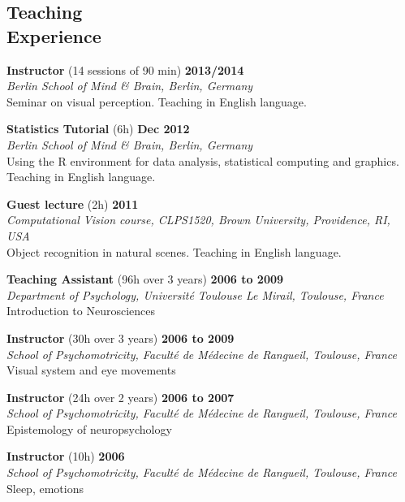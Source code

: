\documentclass[margin,line]{resume}
\begin{document}
\begin{resume}
    \section{\mysidestyle Teaching\\Experience}
    
    \textbf{Instructor} (14 sessions of 90 min) \hfill \textbf{2013/2014}\\
	\textsl{Berlin School of Mind \& Brain, Berlin, Germany}\\
	Seminar on visual perception. Teaching in English language.
	
    \textbf{Statistics Tutorial} (6h) \hfill \textbf{Dec 2012}\\
	\textsl{Berlin School of Mind \& Brain, Berlin, Germany}\\
	Using the R environment for data analysis, statistical computing and graphics. Teaching in English language.

	\textbf{Guest lecture} (2h) \hfill \textbf{2011}\\
	\textsl{Computational Vision course, CLPS1520, Brown University, Providence, RI, USA}\\
	Object recognition in natural scenes. Teaching in English language.

	\textbf{Teaching Assistant} (96h over 3 years) \hfill \textbf{2006 to 2009}\\
	\textsl{Department of Psychology, Université Toulouse Le Mirail, Toulouse, France}\\
	Introduction to Neurosciences

	\textbf{Instructor} (30h over 3 years) \hfill \textbf{2006 to 2009}\\
	\textsl{School of Psychomotricity, Faculté de Médecine de Rangueil, Toulouse, France}\\
	Visual system and eye movements

	\textbf{Instructor} (24h over 2 years) \hfill \textbf{2006 to 2007}\\
	\textsl{School of Psychomotricity, Faculté de Médecine de Rangueil, Toulouse, France}\\
	Epistemology of neuropsychology

	\textbf{Instructor} (10h) \hfill \textbf{2006}\\
	\textsl{School of Psychomotricity, Faculté de Médecine de Rangueil, Toulouse, France}\\
	Sleep, emotions


	\vspace{3mm}

\end{resume}
\end{document}
